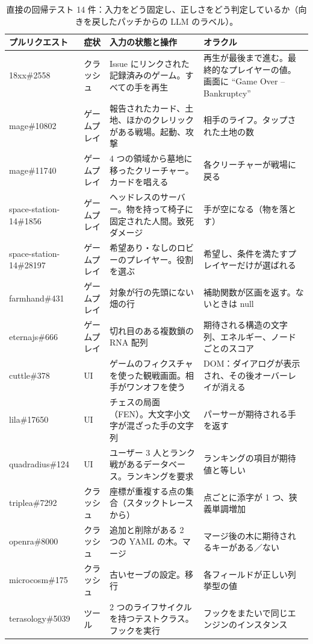 \documentclass[a4paper,twocolumn,9pt]{ltjsarticle}
\begin{document}
\begin{table}[tb]
\centering
\caption{直接の回帰テスト 14 件：入力をどう固定し、正しさをどう判定しているか（向きを戻したパッチからの LLM のラベル）。}\label{tab:direct}
\footnotesize\setlength{\tabcolsep}{3pt}
\begin{tabularx}{\textwidth}{@{}P{30mm}P{16mm}LL@{}}
\toprule
プルリクエスト & 症状 & 入力の状態と操作 & オラクル\\
\midrule
18xx\#2558 & クラッシュ & Issue にリンクされた記録済みのゲーム。すべての手を再生 & 再生が最後まで進む。最終的なプレイヤーの値。画面に ``Game Over -- Bankruptcy''\\
mage\#10802 & ゲームプレイ & 報告されたカード、土地、ほかのクレリックがある戦場。起動、攻撃 & 相手のライフ。タップされた土地の数\\
mage\#11740 & ゲームプレイ & 4 つの領域から墓地に移ったクリーチャー。カードを唱える & 各クリーチャーが戦場に戻る\\
space-station-14\#1856 & ゲームプレイ & ヘッドレスのサーバー。物を持って椅子に固定された人間。致死ダメージ & 手が空になる（物を落とす）\\
space-station-14\#28197 & ゲームプレイ & 希望あり・なしのロビーのプレイヤー。役割を選ぶ & 希望し、条件を満たすプレイヤーだけが選ばれる\\
farmhand\#431 & ゲームプレイ & 対象が行の先頭にない畑の行 & 補助関数が区画を返す。ないときは null\\
eternajs\#666 & ゲームプレイ & 切れ目のある複数鎖の RNA 配列 & 期待される構造の文字列、エネルギー、ノードごとのスコア\\
cuttle\#378 & UI & ゲームのフィクスチャを使った観戦画面。相手がワンオフを使う & DOM：ダイアログが表示され、その後オーバーレイが消える\\
lila\#17650 & UI & チェスの局面（FEN）。大文字小文字が混ざった手の文字列 & パーサーが期待される手を返す\\
quadradius\#124 & UI & ユーザー 3 人とランク戦があるデータベース。ランキングを要求 & ランキングの項目が期待値と等しい\\
triplea\#7292 & クラッシュ & 座標が重複する点の集合（スタックトレースから） & 点ごとに添字が 1 つ、狭義単調増加\\
openra\#8000 & クラッシュ & 追加と削除がある 2 つの YAML の木。マージ & マージ後の木に期待されるキーがある／ない\\
microcosm\#175 & クラッシュ & 古いセーブの設定。移行 & 各フィールドが正しい列挙型の値\\
terasology\#5039 & ツール & 2 つのライフサイクルを持つテストクラス。フックを実行 & フックをまたいで同じエンジンのインスタンス\\
\bottomrule
\end{tabularx}
\end{table}
\end{document}
